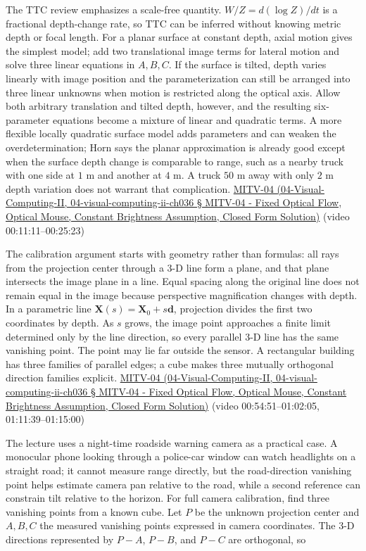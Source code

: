 The TTC review emphasizes a scale-free quantity. \(W/Z=d(\log Z)/dt\) is a fractional depth-change rate, so TTC can be inferred without knowing metric depth or focal length. For a planar surface at constant depth, axial motion gives the simplest model; add two translational image terms for lateral motion and solve three linear equations in \(A,B,C\). If the surface is tilted, depth varies linearly with image position and the parameterization can still be arranged into three linear unknowns when motion is restricted along the optical axis. Allow both arbitrary translation and tilted depth, however, and the resulting six-parameter equations become a mixture of linear and quadratic terms. A more flexible locally quadratic surface model adds parameters and can weaken the overdetermination; Horn says the planar approximation is already good except when the surface depth change is comparable to range, such as a nearby truck with one side at \(1\) m and another at \(4\) m. A truck \(50\) m away with only \(2\) m depth variation does not warrant that complication. \href{}{MITV-04 (04-Visual-Computing-II, 04-visual-computing-ii-ch036 § MITV-04 - Fixed Optical Flow, Optical Mouse, Constant Brightness Assumption, Closed Form Solution)} (video 00:11:11--00:25:23)

The calibration argument starts with geometry rather than formulas: all rays from the projection center through a 3-D line form a plane, and that plane intersects the image plane in a line. Equal spacing along the original line does not remain equal in the image because perspective magnification changes with depth. In a parametric line \(\mathbf{X}(s)=\mathbf{X}_0+s\mathbf{d}\), projection divides the first two coordinates by depth. As \(s\) grows, the image point approaches a finite limit determined only by the line direction, so every parallel 3-D line has the same vanishing point. The point may lie far outside the sensor. A rectangular building has three families of parallel edges; a cube makes three mutually orthogonal direction families explicit. \href{}{MITV-04 (04-Visual-Computing-II, 04-visual-computing-ii-ch036 § MITV-04 - Fixed Optical Flow, Optical Mouse, Constant Brightness Assumption, Closed Form Solution)} (video 00:54:51--01:02:05, 01:11:39--01:15:00)

The lecture uses a night-time roadside warning camera as a practical case. A monocular phone looking through a police-car window can watch headlights on a straight road; it cannot measure range directly, but the road-direction vanishing point helps estimate camera pan relative to the road, while a second reference can constrain tilt relative to the horizon. For full camera calibration, find three vanishing points from a known cube. Let \(P\) be the unknown projection center and \(A,B,C\) the measured vanishing points expressed in camera coordinates. The 3-D directions represented by \(P-A\), \(P-B\), and \(P-C\) are orthogonal, so

